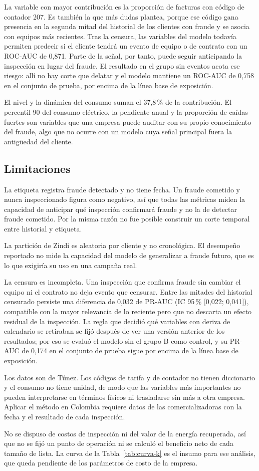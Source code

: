 La variable con mayor contribución es la proporción de facturas con código de contador 207.
Es también la que más dudas plantea, porque ese código gana presencia en la segunda mitad del
historial de los clientes con fraude y se asocia con equipos más recientes. Tras la censura,
las variables del modelo todavía permiten predecir si el cliente tendrá un evento de equipo o
de contrato con un ROC-AUC de 0,871. Parte de la señal, por tanto, puede seguir anticipando
la inspección en lugar del fraude. El resultado en el grupo sin eventos acota ese riesgo: allí
no hay corte que delatar y el modelo mantiene un ROC-AUC de 0,758 en el conjunto de prueba,
por encima de la línea base de exposición.

El nivel y la dinámica del consumo suman el 37,8\,\% de la contribución. El percentil 90 del
consumo eléctrico, la pendiente anual y la proporción de caídas fuertes son variables que
una empresa puede auditar con su propio conocimiento del fraude, algo que no ocurre con un
modelo cuya señal principal fuera la antigüedad del cliente.

\subsection{Limitaciones}

La etiqueta registra fraude detectado y no tiene fecha. Un fraude cometido y nunca
inspeccionado figura como negativo, así que todas las métricas miden la capacidad de
anticipar qué inspección confirmará fraude y no la de detectar fraude cometido. Por la misma
razón no fue posible construir un corte temporal entre historial y etiqueta.

La partición de Zindi es aleatoria por cliente y no cronológica. El desempeño reportado no
mide la capacidad del modelo de generalizar a fraude futuro, que es lo que exigiría su uso en
una campaña real.

La censura es incompleta. Una inspección que confirma fraude sin cambiar el equipo ni el
contrato no deja evento que censurar. Entre las mitades del historial censurado persiste una
diferencia de 0,032 de PR-AUC (IC 95\,\% [0,022; 0,041]), compatible con la mayor relevancia de
lo reciente pero que no descarta un efecto residual de la inspección. La regla que decidió
qué variables con deriva de calendario se retiraban se fijó después de ver una versión
anterior de los resultados; por eso se evaluó el modelo sin el grupo B como control, y su
PR-AUC de 0,174 en el conjunto de prueba sigue por encima de la línea base de exposición.

Los datos son de Túnez. Los códigos de tarifa y de contador no tienen diccionario y el
consumo no tiene unidad, de modo que las variables más importantes no pueden interpretarse
en términos físicos ni trasladarse sin más a otra empresa. Aplicar el método en Colombia
requiere datos de las comercializadoras con la fecha y el resultado de cada inspección.

No se dispuso de costos de inspección ni del valor de la energía recuperada, así que no se
fijó un punto de operación ni se calculó el beneficio neto de cada tamaño de lista. La curva
de la Tabla~\ref{tab:curva-k} es el insumo para ese análisis, que queda pendiente de los
parámetros de costo de la empresa.
